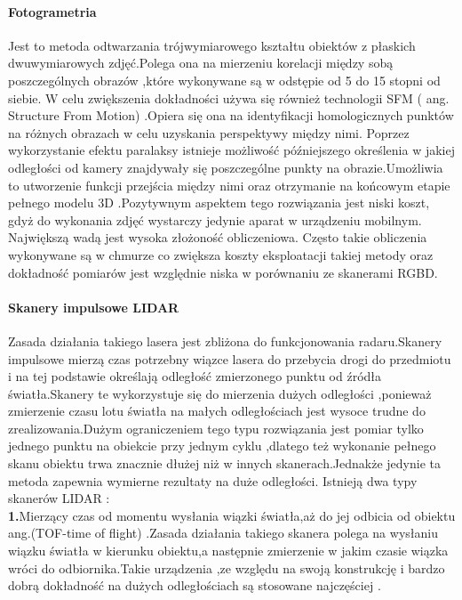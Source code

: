 \documentclass[12pt]{article}
\begin{document}
\paragraph{Fotogrametria\newline}

Jest to metoda odtwarzania trójwymiarowego kształtu obiektów z płaskich dwuwymiarowych zdjęć.Polega ona na mierzeniu korelacji między sobą poszczególnych obrazów ,które wykonywane są w odstępie od 5 do 15 stopni od siebie. W celu zwiększenia dokładności używa się również technologii SFM ( ang. Structure From Motion) .Opiera się ona na identyfikacji homologicznych punktów na różnych obrazach w celu uzyskania perspektywy między nimi. Poprzez wykorzystanie efektu paralaksy istnieje możliwość późniejszego określenia w jakiej odległości od kamery znajdywały się poszczególne punkty na obrazie.Umożliwia to utworzenie funkcji przejścia między nimi oraz otrzymanie na końcowym etapie pełnego modelu 3D \cite{glowienka2015fotogrametria} .Pozytywnym aspektem tego rozwiązania jest niski koszt, gdyż do wykonania zdjęć wystarczy jedynie aparat w urządzeniu mobilnym. Największą wadą jest wysoka złożoność obliczeniowa. Często takie obliczenia wykonywane są w chmurze co zwiększa koszty eksploatacji takiej metody oraz dokładność pomiarów jest względnie niska w porównaniu ze skanerami RGBD.

\paragraph{Skanery impulsowe LIDAR\newline}

Zasada działania takiego lasera jest zbliżona do funkcjonowania radaru.Skanery impulsowe mierzą czas potrzebny wiązce lasera do przebycia drogi do przedmiotu i na tej podstawie określają odległość zmierzonego punktu od  źródła światła.Skanery te wykorzystuje się do mierzenia dużych odległości ,ponieważ zmierzenie czasu lotu światła na małych odległościach jest wysoce trudne do zrealizowania.Dużym ograniczeniem tego typu rozwiązania jest pomiar tylko jednego punktu na obiekcie przy jednym cyklu ,dlatego też wykonanie pełnego skanu obiektu trwa znacznie dłużej niż w innych skanerach.Jednakże jedynie ta metoda zapewnia wymierne rezultaty na duże odległości.
\newline
Istnieją dwa typy skanerów LIDAR \cite{wehr1999airborne}:\\
\textbf{1.}Mierzący czas od momentu wysłania wiązki światła,aż do jej odbicia od obiektu ang.(TOF-time of flight) .Zasada działania takiego skanera polega na wysłaniu wiązku światła w kierunku obiektu,a następnie zmierzenie w jakim czasie wiązka wróci do odbiornika.Takie urządzenia ,ze względu na swoją konstrukcję i bardzo dobrą dokładność na dużych odległościach są stosowane najczęściej \cite{introToLidar}.
\end{document}

